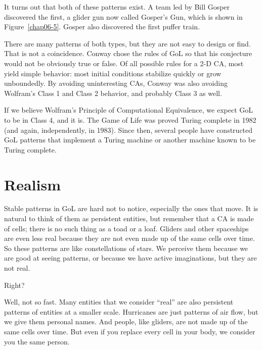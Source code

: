 \documentclass[12pt]{book}
\theoremstyle{exercise}
\begin{document}

It turns out that both of these patterns exist.  A team led
by Bill Gosper discovered the first, a glider gun now called
Gosper's Gun, which is shown in Figure~\ref{chap06-5}.
Gosper also discovered the first puffer train.


There are many patterns of both types, but they are not easy to
design or find.  That is not a coincidence.  Conway chose the
rules of GoL so that his conjecture would not be obviously
true or false.  Of all possible rules for a 2-D CA, most
yield simple behavior: most initial conditions stabilize quickly
or grow unboundedly.  By avoiding uninteresting CAs, Conway
was also avoiding Wolfram's Class 1 and Class 2 behavior, and
probably Class 3 as well.

If we believe Wolfram's Principle of Computational Equivalence, we
expect GoL to be in Class 4, and it is.  The Game of Life was proved
Turing complete in 1982 (and again, independently, in 1983).
Since then, several people have constructed GoL patterns that implement
a Turing machine or another machine known to be Turing complete.



\section{Realism}

Stable patterns in GoL are hard not to notice, especially the ones
that move.  It is natural to think of them as persistent entities, but
remember that a CA is made of cells; there is no such thing as a toad
or a loaf.  Gliders and other spaceships are even less real because
they are not even made up of the same cells over time.  So these
patterns are like constellations of stars.  We perceive them because
we are good at seeing patterns, or because we have active
imaginations, but they are not real.


Right?

Well, not so fast.  Many entities that we consider ``real'' are also
persistent patterns of entities at a smaller scale.  Hurricanes are
just patterns of air flow, but we give them personal names.  And
people, like gliders, are not made up of the same cells over time.
But even if you replace every cell in your body, we consider you the
same person.
\end{document}
